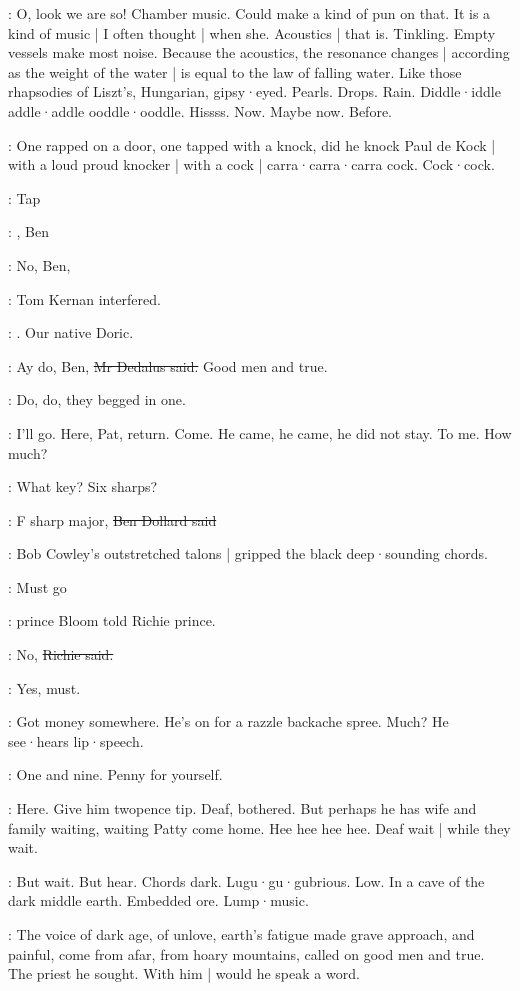 \BloomIntB:
O,
look we are so!
Chamber music.
Could make a kind of pun on that.
It is a kind of music |
I often thought |
when she.
Acoustics |
that is.
Tinkling.
Empty vessels make most noise.
Because the acoustics,
the resonance changes |
according as the weight of the water |
is equal to the law of falling water.
Like those rhapsodies of Liszt's,
Hungarian,
gipsy·eyed.
Pearls.
Drops.
Rain.
Diddle·iddle addle·addle ooddle·ooddle.
Hissss.
Now.
Maybe now.
Before.

\BloomIntB:
One rapped on a door,
one tapped with a knock,
did he knock Paul de Kock |
with a loud proud knocker |
with a cock |
carra·carra·carra cock.
Cock·cock.

\stripling:
Tap

\cowley:
,
Ben

:
No, Ben,

:
Tom Kernan interfered.

:
.
Our native Doric.

\simon:
Ay do,
Ben,
\sout{Mr Dedalus said.}
Good men and true.

:
Do,
do,
they begged in one.

\BloomIntA:
I'll go.
Here,
Pat,
return.
Come.
He came,
he came,
he did not stay.
To me.
How much?

\cowley:
What key?
Six sharps?

\dollard:
F sharp major,
\sout{Ben Dollard said}

:
Bob Cowley's outstretched talons |
gripped the black deep·sounding chords.

\Bloom:
Must go

:
prince Bloom told Richie prince.

\goulding:
No,
\sout{Richie said.}

\Bloom:
Yes,
must.

\BloomIntA:
Got money somewhere.
He's on for a razzle backache spree.
Much?
He see·hears lip·speech.

\Bloom:
One and nine.
Penny for yourself.

\BloomIntA:
Here.
Give him twopence tip.
Deaf,
bothered.
But perhaps he has wife and family waiting,
waiting Patty come home.
Hee hee hee hee.
Deaf wait |
while they wait.

\BloomIntA:
But wait.
But hear.
Chords dark.
Lugu·gu·gubrious.
Low.
In a cave of the dark middle earth.
Embedded ore.
Lump·music.

:
The voice of dark age,
of unlove,
earth's fatigue made grave approach,
and painful,
come from afar,
from hoary mountains,
called on good men and true.
The priest he sought.
With him |
would he speak a word.

